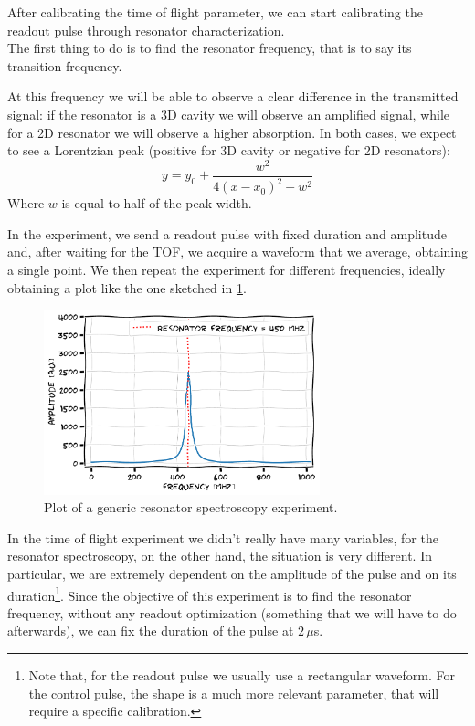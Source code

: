 
After calibrating the time of flight parameter, we can start calibrating the readout pulse through resonator characterization.\\
The first thing to do is to find the resonator frequency, that is to say its transition frequency.

At this frequency we will be able to observe a clear difference in the transmitted signal: if the resonator is a 3D cavity we will observe an amplified signal, while for a 2D resonator we will observe a higher absorption.
In both cases, we expect to see a Lorentzian peak (positive for 3D cavity or negative for 2D resonators):
\begin{equation}
    y=y_0 + \frac{w^2}{4(x-x_0)^2+w^2}
\end{equation}
Where $w$ is equal to half of the peak width.

In the experiment, we send a readout pulse with fixed duration and amplitude and, after waiting for the TOF, we acquire a waveform that we average, obtaining a single point. 
We then repeat the experiment for different frequencies, ideally obtaining a plot like the one sketched in \cref{fig:resonator_spectroscopy_sketch}.

\begin{figure}[ht]
    \centering
    \includegraphics[width=8cm]{characterization/figures/resonator_spectroscopy_sketch.pdf}
    \caption{Plot of a generic resonator spectroscopy experiment.}
    \label{fig:resonator_spectroscopy_sketch}
\end{figure}

In the time of flight experiment we didn't really have many variables, for the resonator spectroscopy, on the other hand, the situation is very different.
In particular, we are extremely dependent on the amplitude of the pulse and on its duration\footnote{Note that, for the readout pulse we usually use a rectangular waveform. For the control pulse, the shape is a much more relevant parameter, that will require a specific calibration.}.
Since the objective of this experiment is to find the resonator frequency, without any readout optimization (something that we will have to do afterwards), we can fix the duration of the pulse at $2\,\mu$s.

